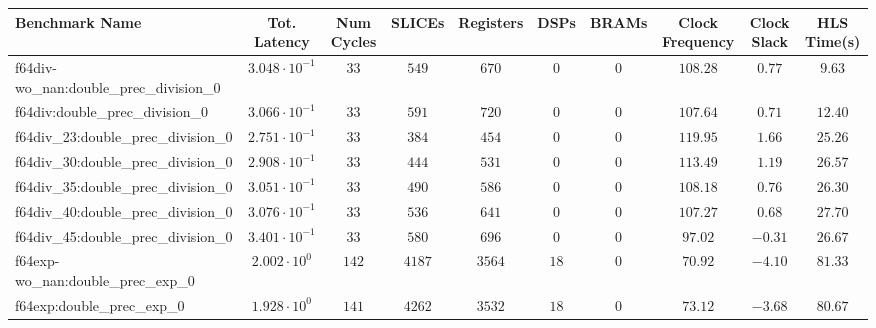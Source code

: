 \begin{tabular}{|l|c|c|c|c|c|c|c|c|c|}
\hline
Benchmark Name                                 & Tot. Latency            & Num Cycles & SLICEs     & Registers & DSPs    & BRAMs  & Clock Frequency & Clock Slack & HLS Time(s) \\
\hline
f64div-wo\_nan:double\_prec\_division\_0       & $ 3.048 \cdot 10^{-1} $ & $ 33     $ & $ 549    $ & $ 670   $ & $ 0   $ & $ 0  $ & $ 108.28      $ & $ 0.77    $ & $ 9.63    $ \\
f64div:double\_prec\_division\_0               & $ 3.066 \cdot 10^{-1} $ & $ 33     $ & $ 591    $ & $ 720   $ & $ 0   $ & $ 0  $ & $ 107.64      $ & $ 0.71    $ & $ 12.40   $ \\
f64div\_23:double\_prec\_division\_0           & $ 2.751 \cdot 10^{-1} $ & $ 33     $ & $ 384    $ & $ 454   $ & $ 0   $ & $ 0  $ & $ 119.95      $ & $ 1.66    $ & $ 25.26   $ \\
f64div\_30:double\_prec\_division\_0           & $ 2.908 \cdot 10^{-1} $ & $ 33     $ & $ 444    $ & $ 531   $ & $ 0   $ & $ 0  $ & $ 113.49      $ & $ 1.19    $ & $ 26.57   $ \\
f64div\_35:double\_prec\_division\_0           & $ 3.051 \cdot 10^{-1} $ & $ 33     $ & $ 490    $ & $ 586   $ & $ 0   $ & $ 0  $ & $ 108.18      $ & $ 0.76    $ & $ 26.30   $ \\
f64div\_40:double\_prec\_division\_0           & $ 3.076 \cdot 10^{-1} $ & $ 33     $ & $ 536    $ & $ 641   $ & $ 0   $ & $ 0  $ & $ 107.27      $ & $ 0.68    $ & $ 27.70   $ \\
f64div\_45:double\_prec\_division\_0           & $ 3.401 \cdot 10^{-1} $ & $ 33     $ & $ 580    $ & $ 696   $ & $ 0   $ & $ 0  $ & $ 97.02       $ & $ -0.31   $ & $ 26.67   $ \\
f64exp-wo\_nan:double\_prec\_exp\_0            & $ 2.002 \cdot 10^{0}  $ & $ 142    $ & $ 4187   $ & $ 3564  $ & $ 18  $ & $ 0  $ & $ 70.92       $ & $ -4.10   $ & $ 81.33   $ \\
f64exp:double\_prec\_exp\_0                    & $ 1.928 \cdot 10^{0}  $ & $ 141    $ & $ 4262   $ & $ 3532  $ & $ 18  $ & $ 0  $ & $ 73.12       $ & $ -3.68   $ & $ 80.67   $ \\

\end{tabular}
